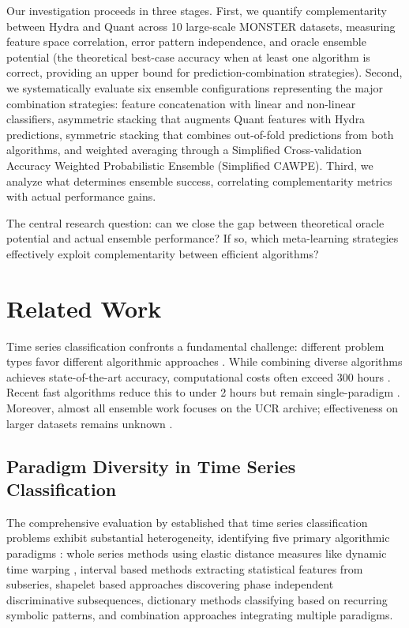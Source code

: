 \documentclass[pdflatex,sn-basic]{sn-jnl}           %
\theoremstyle{thmstyleone}%
\theoremstyle{thmstyletwo}%
\theoremstyle{thmstylethree}%
\begin{document}
Our investigation proceeds in three stages. First, we quantify complementarity between Hydra and Quant across 10 large-scale MONSTER datasets, measuring feature space correlation, error pattern independence, and oracle ensemble potential (the theoretical best-case accuracy when at least one algorithm is correct, providing an upper bound for prediction-combination strategies). Second, we systematically evaluate six ensemble configurations representing the major combination strategies: feature concatenation with linear and non-linear classifiers, asymmetric stacking that augments Quant features with Hydra predictions, symmetric stacking that combines out-of-fold predictions from both algorithms, and weighted averaging through a Simplified Cross-validation Accuracy Weighted Probabilistic Ensemble (Simplified CAWPE). Third, we analyze what determines ensemble success, correlating complementarity metrics with actual performance gains.

The central research question: can we close the gap between theoretical oracle potential and actual ensemble performance? If so, which meta-learning strategies effectively exploit complementarity between efficient algorithms?

\section{Related Work}\label{sec2}

Time series classification confronts a fundamental challenge: different problem types favor different algorithmic approaches \citep{tsc-bakeoff}. While combining diverse algorithms achieves state-of-the-art accuracy, computational costs often exceed 300 hours \citep{hive-cote-2}. Recent fast algorithms reduce this to under 2 hours but remain single-paradigm \citep{rocket, hydra, quant}. Moreover, almost all ensemble work focuses on the UCR archive; effectiveness on larger datasets remains unknown \citep{bakeoff-redux}.

\subsection{Paradigm Diversity in Time Series Classification}

The comprehensive evaluation by \citet{tsc-bakeoff} established that time series classification problems exhibit substantial heterogeneity, identifying five primary algorithmic paradigms \citep[Section~2, pp.~610--611]{tsc-bakeoff}: whole series methods using elastic distance measures like dynamic time warping \citep[p.~611]{tsc-bakeoff}, interval based methods extracting statistical features from subseries, shapelet based approaches discovering phase independent discriminative subsequences, dictionary methods classifying based on recurring symbolic patterns, and combination approaches integrating multiple paradigms.
\end{document}

